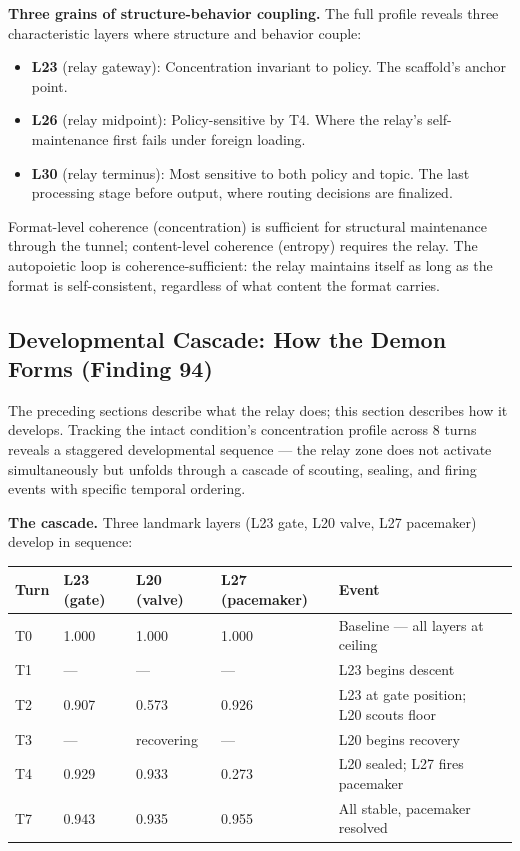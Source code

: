 \documentclass[12pt]{article}
\begin{document}
\textbf{Three grains of structure-behavior coupling.} The full profile reveals three characteristic layers where structure and behavior couple:
\begin{itemize}
\item \textbf{L23} (relay gateway): Concentration invariant to policy. The scaffold's anchor point.
\item \textbf{L26} (relay midpoint): Policy-sensitive by T4. Where the relay's self-maintenance first fails under foreign loading.
\item \textbf{L30} (relay terminus): Most sensitive to both policy and topic. The last processing stage before output, where routing decisions are finalized.
\end{itemize}

Format-level coherence (concentration) is sufficient for structural maintenance through the tunnel; content-level coherence (entropy) requires the relay. The autopoietic loop is coherence-sufficient: the relay maintains itself as long as the format is self-consistent, regardless of what content the format carries.

\subsection{Developmental Cascade: How the Demon Forms (Finding 94)}

The preceding sections describe what the relay does; this section describes how it develops. Tracking the intact condition's concentration profile across 8 turns reveals a staggered developmental sequence --- the relay zone does not activate simultaneously but unfolds through a cascade of scouting, sealing, and firing events with specific temporal ordering.

\textbf{The cascade.} Three landmark layers (L23 gate, L20 valve, L27 pacemaker) develop in sequence:

\begin{table}[h]
\centering
\begin{tabular}{llllll}
\toprule
\textbf{Turn} & \textbf{L23 (gate)} & \textbf{L20 (valve)} & \textbf{L27 (pacemaker)} & \textbf{Event} \\
\midrule
T0 & 1.000 & 1.000 & 1.000 & Baseline --- all layers at ceiling \\
T1 & --- & --- & --- & L23 begins descent \\
T2 & 0.907 & 0.573 & 0.926 & L23 at gate position; L20 scouts floor \\
T3 & --- & recovering & --- & L20 begins recovery \\
T4 & 0.929 & 0.933 & 0.273 & L20 sealed; L27 fires pacemaker \\
T7 & 0.943 & 0.935 & 0.955 & All stable, pacemaker resolved \\
\bottomrule
\end{tabular}
\end{table}
\end{document}
